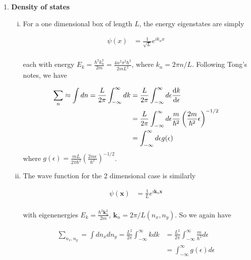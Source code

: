 \documentclass[]{article}
\begin{document}
\begin{enumerate}[1.]
\begin{enumerate}[i.]
\end{enumerate}

\noindent\rule{15cm}{0.4pt} \\

\item {\bf  Density of states}

\begin{enumerate}[i.]

\item For a one dimensional box of length $L$, the energy eigenstates are simply

\begin{equation}
\begin{split}
\psi(x) & = \frac{1}{\sqrt{L}} e^{ik_nx} \\
\end{split}
\end{equation}

each with energy $E_k = \frac{\hbar^2k_n^2}{2m} = \frac{4n^2\pi^2\hbar^2}{2mL^2}$, where $k_n = 2\pi n/L$. Following Tong's notes, we have

\begin{equation}
\begin{split}
\sum_n \approx \int dn = \frac{L}{2\pi} \int_{-\infty}^\infty dk  & = \frac{L}{2\pi} \int_{-\infty}^\infty d\epsilon \dv{k}{\epsilon} \\
& =  \frac{L}{2\pi} \int_{-\infty}^\infty d\epsilon  \frac{m}{\hbar^2}\left( \frac{2m}{\hbar^2} \epsilon  \right)^{-1/2} \\ 
& = \int_{-\infty}^\infty d\epsilon g(\epsilon) \\
\end{split}
\end{equation}
where $g(\epsilon)  = \frac{mL}{2\pi\hbar^2} \left( \frac{2m\epsilon}{\hbar^2}\right)^{-1/2}$. \\

\item The wave function for the 2 dimensional case is similarly

\begin{equation}
\begin{split}
\psi(\bm{x}) & = \frac{1}{L} e^{i\bm{k}_n\bm{x}} \\
\end{split}
\end{equation}

with eigenenergies $E_k = \frac{\hbar^2\bm{k}_n^2}{2m}$, $\bm{k}_n = 2\pi/L(n_x, n_y)$. So we again have

\begin{equation}
\begin{split}
\sum_{n_x,n_y} = \int dn_x dn_y = \frac{L^2}{2\pi} \int_{-\infty}^{\infty} k dk & = \frac{L^2}{2\pi} \int_{-\infty}^{\infty} \frac{m}{\hbar^2} d\epsilon  \\ 
& =  \int_{-\infty}^{\infty} g(\epsilon) d\epsilon  \\ 
\end{split}
\end{equation}


\end{enumerate}
\end{enumerate}
\end{document}
